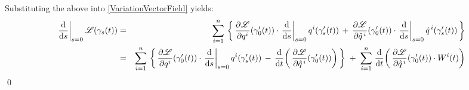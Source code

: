 Substituting the above into \eqref{VariationVectorField} yields:
\begin{eqnarray*}
\left.\dfrac{\d}{\d s}\right\vert_{s=0} \mathscr{L}\!\left(\gamma_{s}(t)\right)
& = &
	\overset{n}{\underset{i=1}{\sum}}\,\left\{\,
		\dfrac{\partial\mathscr{L}}{\partial q^{i}}\!\left(\gamma^{\prime}_{0}(t)\right)
		\cdot
		\left.\dfrac{\d}{\d s}\right\vert_{s=0} q^{i}(\gamma^{\prime}_{s}(t))
		\, + \,
		\dfrac{\partial\mathscr{L}}{\partial\hat{q}^{\,i}}\!\left(\gamma^{\prime}_{0}(t)\right)
		\cdot
		\left.\dfrac{\d}{\d s}\right\vert_{s=0} \hat{q}^{\,i}(\gamma^{\prime}_{s}(t))
		\,\right\}
\\
& = &
	\overset{n}{\underset{i=1}{\sum}}\,\left\{\,
		\dfrac{\partial\mathscr{L}}{\partial q^{i}}\!\left(\gamma^{\prime}_{0}(t)\right)
		\cdot
		\left.\dfrac{\d}{\d s}\right\vert_{s=0} q^{i}(\gamma^{\prime}_{s}(t))
		\, - \,
		\dfrac{\d}{\d t}\!\left(\,
			\dfrac{\partial\mathscr{L}}{\partial\hat{q}^{\,i}}\!\left(\gamma^{\prime}_{0}(t)\right)
			\right)	
		\,\right\}
	\; + \;
	\overset{n}{\underset{i=1}{\sum}}\;
	\dfrac{\d}{\d t}\!\left(\,
		\dfrac{\partial\mathscr{L}}{\partial\hat{q}^{\,i}}\!\left(\gamma^{\prime}_{0}(t)\right)
		\cdot
		W^{i}(t)
		\right)
\end{eqnarray*}
\qed




